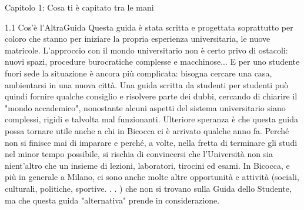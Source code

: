 Capitolo 1: Cosa ti è capitato tra le mani

1.1 Cos’è l’AltraGuida
Questa guida è stata scritta e progettata soprattutto per coloro che stanno per iniziare la propria esperienza universitaria, le nuove matricole. L'approccio con il mondo universitario non è certo privo di ostacoli: nuovi spazi, procedure burocratiche complesse e macchinose... E per uno studente fuori sede la situazione è ancora più complicata: bisogna cercare una casa, ambientarsi in una nuova città.
Una guida scritta da studenti per studenti può quindi fornire qualche consiglio e risolvere parte dei dubbi, cercando di chiarire il "mondo accademico", nonostante alcuni aspetti del sistema universitario siano complessi, rigidi e talvolta mal funzionanti. Ulteriore speranza è che questa guida possa tornare utile anche a chi in Bicocca ci è arrivato qualche anno fa. Perché non si finisce mai di imparare e perché, a volte, nella fretta di terminare gli studi nel minor tempo possibile, si rischia di convincersi che l'Università non sia nient'altro che un insieme di lezioni, laboratori, tirocini ed esami. In Bicocca, e più in generale a Milano, ci sono anche molte altre opportunità e attività (sociali, culturali, politiche, sportive. . . ) che non si trovano sulla Guida dello Studente, ma che questa guida "alternativa" prende in considerazione.

